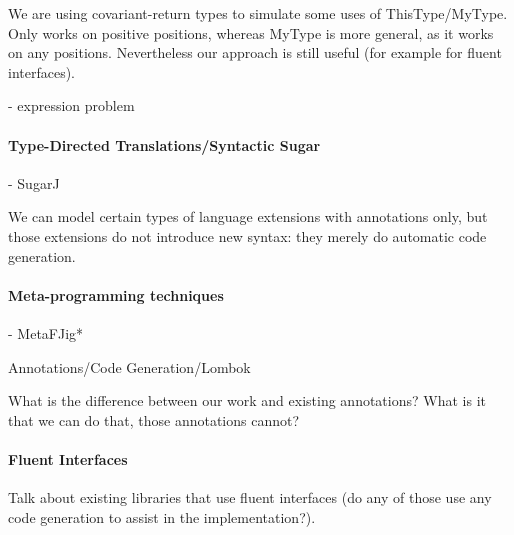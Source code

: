 We are using covariant-return types to simulate some uses 
of ThisType/MyType. Only works on positive positions, whereas 
MyType is more general, as it works on any positions. Nevertheless 
our approach is still useful (for example for fluent interfaces). 

- expression problem


\paragraph{Type-Directed Translations/Syntactic Sugar}

- SugarJ

We can model certain types of language extensions with annotations 
only, but those extensions do not introduce new syntax: they 
merely do automatic code generation. 

\paragraph{Meta-programming techniques}
- MetaFJig*

Annotations/Code Generation/Lombok

What is the difference between our work and existing annotations? 
What is it that we can do that, those annotations cannot?

\paragraph{Fluent Interfaces}

Talk about existing libraries that use fluent interfaces (do any of 
those use any code generation to assist in the implementation?). 


